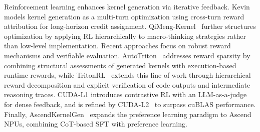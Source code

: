 Reinforcement learning enhances kernel generation via iterative feedback. Kevin~\cite{baronio2025kevin} models kernel generation as a multi-turn optimization using cross-turn reward attribution for long-horizon credit assignment. QiMeng-Kernel~\cite{zhu2025qimengkernel} further structures optimization by applying RL hierarchically to macro-thinking strategies rather than low-level implementation. Recent approaches focus on robust reward mechanisms and verifiable evaluation. AutoTriton~\cite{li2025autotriton} addresses reward sparsity by combining structural assessments of generated kernels with execution-based runtime rewards, while TritonRL~\cite{woo2025tritonrl} extends this line of work through hierarchical reward decomposition and explicit verification of code outputs and intermediate reasoning traces. CUDA-L1 introduces contrastive RL with an LLM-as-a-judge for dense feedback, and is refined by CUDA-L2~\cite{su2025cudal2surpassingcublasperformance} to surpass cuBLAS performance. Finally, AscendKernelGen~\cite{cao2026ascendkernelgen} expands the preference learning paradigm to Ascend NPUs, combining CoT-based SFT with preference learning.



